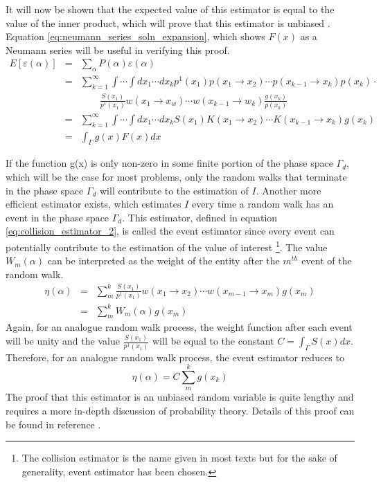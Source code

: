 It will now be shown that the expected value of this estimator is equal to the 
value of the inner product, which will prove that this estimator is unbiased 
\citep{spanier_monte_1969}. Equation \ref{eq:neumann_series_soln_expansion},
which shows $F(x)$ as a Neumann series will be useful in verifying this proof.
\begin{eqnarray}
  E\left[\varepsilon(\alpha)\right] & = & \sum_{\alpha} 
  P(\alpha)\varepsilon(\alpha) \nonumber \\
  & = & \sum_{k=1}^{\infty} \int \cdots \int dx_1 \cdots dx_k p^1(x_1)
  p(x_1 \to x_2) \cdots p(x_{k-1} \to x_k)p(x_k) \cdot \nonumber \\
  & & \qquad \frac{S(x_1)}{p^1(x_1)}w(x_1 \to x_w)\cdots 
  w(x_{k-1} \to w_k)\frac{g(x_k)}{p(x_k)} \nonumber \\
  & = & \sum_{k=1}^{\infty} \int \cdots \int dx_1 \cdots dx_k S(x_1)K(x_1 \to x_2)
  \cdots K(x_{k-1} \to x_k)g(x_k) \nonumber \\
  & = & \int_{\Gamma} g(x)F(x)dx \nonumber  
\end{eqnarray}

If the function g(x) is only non-zero in some finite portion of the phase space
$\Gamma_d$, which will be the case for most problems, only the random walks 
that terminate in the phase space $\Gamma_d$ will contribute to the 
estimation of $I$. Another more efficient estimator exists, which estimates $I$
every time a random walk has an event in the phase space $\Gamma_d$. This 
estimator, defined in equation \ref{eq:collision_estimator_2}, is called the 
event estimator since every event can potentially contribute to the estimation 
of the value of interest \footnote{The collision estimator is the name given
in most texts but for the sake of generality, event estimator has been 
chosen.}. The value $W_m(\alpha)$ can be interpreted as the weight of the 
entity after the $m^{th}$ event of the random walk.
\begin{eqnarray}
  \eta(\alpha) & = & \sum_m^k \frac{S(x_1)}{p^1(x_1)}w(x_1 \to x_2) \cdots 
  w(x_{m-1} \to x_m) g(x_m) \nonumber \\
  & = & \sum_m^k W_m(\alpha) g(x_m)
  \label{eq:collision_estimator_2}
\end{eqnarray}
Again, for an analogue random walk process, the weight function after each 
event will be unity and the value $\frac{S(x_1)}{p^1(x_1)}$ will be equal to 
the constant $C = \int_{\Gamma} S(x)dx$. Therefore, for an analogue random walk 
process, the event estimator reduces to
\begin{equation*}
  \eta(\alpha) = C \sum_m^k g(x_k)
\end{equation*}
The proof that this estimator is an unbiased random variable is quite lengthy 
and requires a more in-depth discussion of probability theory. Details of this
proof can be found in reference \cite{spanier_monte_1969}. 

